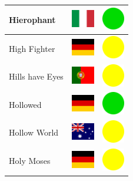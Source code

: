 \documentclass[12pt, a4paper, twoside]{report}
\begin{document}
\begin{center}
\begin{longtable}{|p{5cm}|p{2cm}|p{2cm}|}
Hierophant & \includegraphics[width=1cm]{4x3/it} & \includegraphics[width=1cm]{likes/y} \\ \hline
High Fighter & \includegraphics[width=1cm]{4x3/de} & \includegraphics[width=1cm]{likes/m} \\ \hline
Hills have Eyes & \includegraphics[width=1cm]{4x3/pt} & \includegraphics[width=1cm]{likes/m} \\ \hline
Hollowed & \includegraphics[width=1cm]{4x3/de} & \includegraphics[width=1cm]{likes/y} \\ \hline
Hollow World & \includegraphics[width=1cm]{4x3/au} & \includegraphics[width=1cm]{likes/m} \\ \hline
Holy Moses & \includegraphics[width=1cm]{4x3/de} & \includegraphics[width=1cm]{likes/m} \\ \hline

\end{longtable}
\end{center}
\end{document}
